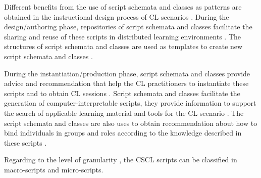 Different benefits from the use of script schemata and classes as patterns are obtained in the instructional design process of CL scenarios \cite{AlharbiAthaudaChiong2014, ChallcoBittencourtIsotani2016, MiaoHoeksemaHoppeHarrer2005}. During the design/authoring phase, repositories of script schemata and classes facilitate the sharing and reuse of these scripts in distributed learning environments \cite{PrietoAsensio-PerezMunoz-CristobalDimitriadisJorrin-AbellanGomez-Sanchez2013, PrietoTchounikineAsensio-PerezSobreiraDimitriadis2014}. The structures of script schemata and classes are used as templates to create new script schemata and classes \cite{AndreasHarrerUlrchHoppe2007, RonenKohen-Vacs2009}. 

During the instantiation/production phase, script schemata and classes provide advice and recommendation that help the CL practitioners to instantiate these scripts and to obtain CL sessions \cite{MagnisalisDemetriadis2012a, PrietoAsensio-PerezDimitriadisGomez-SanchezMunoz-Cristobal2011,Alario-HoyosBote-LorenzoGomez-SanchezAsensio-PerezVega-GorgojoRuiz-Calleja2013}. Script schemata and classes facilitate the generation of computer-interpretable scripts, they provide information to support the search of applicable learning material and tools for the CL scenario \cite{Bote-LorenzoVaquero-GonzalezVega-GorgojoDimitriadisAsensio-PerezGomez-SanchezHernandez-Leo2004, IsotaniMizoguchi2008a, Vega-GorgojoBote-LorenzoGomez-SanchezDimitriadisAsensio-Perez2005}. The script schemata and classes are also uses to obtain recommendation about how to bind individuals in groups and roles according to the knowledge described in these scripts \cite{IsotaniMizoguchiIsotaniCapeliIsotanideAlbuquerqueBittencourtJaques2013,Villasclaras-FernandezHernandez-GonzaloLeoAsensio-PerezDimitriadisMartinez-Mones2009}.

Regarding to the level of granularity \cite{FischerKollarStegmannWeckerZottmann2013}, the CSCL scripts can be classified in macro-scripts and micro-scripts.

